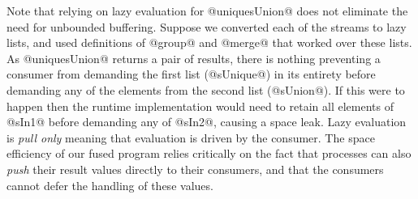 Note that relying on lazy evaluation for @uniquesUnion@ does not eliminate the need for unbounded buffering. Suppose we converted each of the streams to lazy lists, and used definitions of @group@ and @merge@ that worked over these lists. As @uniquesUnion@ returns a pair of results, there is nothing preventing a consumer from demanding the first list (@sUnique@) in its entirety before demanding any of the elements from the second list (@sUnion@). If this were to happen then the runtime implementation would need to retain all elements of @sIn1@ before demanding any of @sIn2@, causing a space leak. Lazy evaluation is \emph{pull only} meaning that evaluation is driven by the consumer. The space efficiency of our fused program relies critically on the fact that processes can also \emph{push} their result values directly to their consumers, and that the consumers cannot defer the handling of these values.




